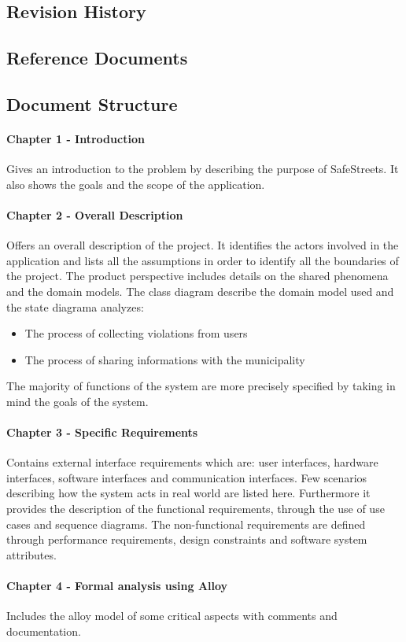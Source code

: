 \documentclass{article}
\begin{document}
\subsection{Revision History}
\subsection{Reference Documents}
\subsection{Document Structure}
\paragraph{Chapter 1 - Introduction}
Gives an introduction to the problem by describing the purpose of SafeStreets. It also shows the goals and the scope of the application. 
\paragraph{Chapter 2 - Overall Description}
Offers an overall description of the project. It identifies the actors involved in the application and lists all the assumptions in order to identify all the boundaries of the project.
The product perspective includes details on the shared phenomena and the domain models.
The class diagram describe the domain model used and the state diagrama analyzes:
\begin{itemize}
    \item The process of collecting violations from users
    \item The process of sharing informations with the municipality
\end{itemize}
The majority of functions of the system are more precisely specified by taking in mind the goals of the system.  
\paragraph{Chapter 3 - Specific Requirements}
Contains external interface requirements which are: user interfaces, hardware interfaces, software interfaces and communication interfaces.
Few scenarios describing how the system acts in real world are listed here.
Furthermore it provides the description of the functional requirements, through the use of use cases and sequence diagrams.
The non-functional requirements are defined through performance requirements, design constraints and software system attributes.
\paragraph{Chapter 4 - Formal analysis using Alloy}
Includes the alloy model of some critical aspects with comments and documentation.
\end{document}
